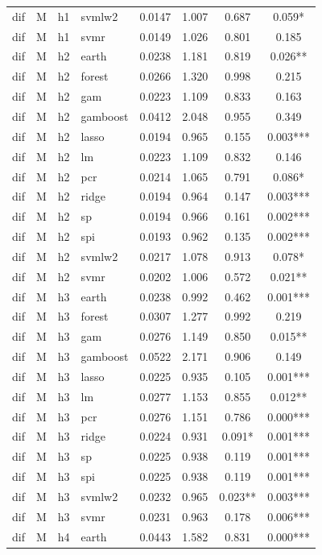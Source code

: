 \begin{ThreePartTable}
\begin{longtable}[t]{llclcccc}
dif & M & h1 & svmlw2 & 0.0147 & 1.007 & 0.687 & 0.059*\\
dif & M & h1 & svmr & 0.0149 & 1.026 & 0.801 & 0.185\\
\addlinespace
dif & M & h2 & earth & 0.0238 & 1.181 & 0.819 & 0.026**\\
dif & M & h2 & forest & 0.0266 & 1.320 & 0.998 & 0.215\\
dif & M & h2 & gam & 0.0223 & 1.109 & 0.833 & 0.163\\
dif & M & h2 & gamboost & 0.0412 & 2.048 & 0.955 & 0.349\\
dif & M & h2 & lasso & 0.0194 & 0.965 & 0.155 & 0.003***\\
dif & M & h2 & lm & 0.0223 & 1.109 & 0.832 & 0.146\\
dif & M & h2 & pcr & 0.0214 & 1.065 & 0.791 & 0.086*\\
dif & M & h2 & ridge & 0.0194 & 0.964 & 0.147 & 0.003***\\
dif & M & h2 & sp & 0.0194 & 0.966 & 0.161 & 0.002***\\
dif & M & h2 & spi & 0.0193 & 0.962 & 0.135 & 0.002***\\
dif & M & h2 & svmlw2 & 0.0217 & 1.078 & 0.913 & 0.078*\\
dif & M & h2 & svmr & 0.0202 & 1.006 & 0.572 & 0.021**\\
\addlinespace
dif & M & h3 & earth & 0.0238 & 0.992 & 0.462 & 0.001***\\
dif & M & h3 & forest & 0.0307 & 1.277 & 0.992 & 0.219\\
dif & M & h3 & gam & 0.0276 & 1.149 & 0.850 & 0.015**\\
dif & M & h3 & gamboost & 0.0522 & 2.171 & 0.906 & 0.149\\
dif & M & h3 & lasso & 0.0225 & 0.935 & 0.105 & 0.001***\\
dif & M & h3 & lm & 0.0277 & 1.153 & 0.855 & 0.012**\\
dif & M & h3 & pcr & 0.0276 & 1.151 & 0.786 & 0.000***\\
dif & M & h3 & ridge & 0.0224 & 0.931 & 0.091* & 0.001***\\
dif & M & h3 & sp & 0.0225 & 0.938 & 0.119 & 0.001***\\
dif & M & h3 & spi & 0.0225 & 0.938 & 0.119 & 0.001***\\
dif & M & h3 & svmlw2 & 0.0232 & 0.965 & 0.023** & 0.003***\\
dif & M & h3 & svmr & 0.0231 & 0.963 & 0.178 & 0.006***\\
\addlinespace
dif & M & h4 & earth & 0.0443 & 1.582 & 0.831 & 0.000***\\

\end{longtable}
\end{ThreePartTable}
